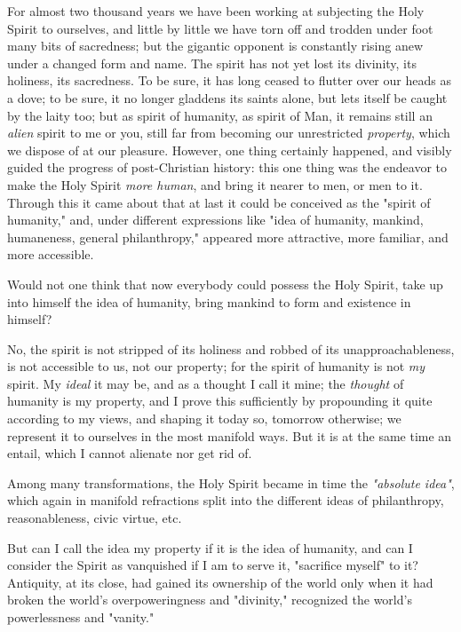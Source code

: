 For almost two thousand years we have been working at subjecting the Holy 
Spirit to ourselves, and little by little we have torn off and trodden under 
foot many bits of sacredness; but the gigantic opponent is constantly rising 
anew under a changed form and name. The spirit has not yet lost its divinity, 
its holiness, its sacredness. To be sure, it has long ceased to flutter over 
our heads as a dove; to be sure, it no longer gladdens its saints alone, but 
lets itself be caught by the laity too; but as spirit of humanity, as spirit 
of Man, it remains still an \textit{alien} spirit to me or you, still far from 
becoming our unrestricted \textit{property}, which we dispose of at our 
pleasure. However, one thing certainly happened, and visibly guided the 
progress of post-Christian history: this one thing was the endeavor to make 
the Holy Spirit \textit{more human}, and bring it nearer to men, or men to it. 
Through this it came about that at last it could be conceived as the "{}spirit 
of humanity,"{} and, under different expressions like "{}idea of humanity, 
mankind, humaneness, general philanthropy,"{} appeared more attractive, more 
familiar, and more accessible.

Would not one think that now everybody could possess the Holy Spirit, take up 
into himself the idea of humanity, bring mankind to form and existence in 
himself?

No, the spirit is not stripped of its holiness and robbed of its 
unapproachableness, is not accessible to us, not our property; for the spirit 
of humanity is not \textit{my} spirit. My \textit{ideal} it may be, and as a 
thought I call it mine; the \textit{thought} of humanity is my property, and I 
prove this sufficiently by propounding it quite according to my views, and 
shaping it today so, tomorrow otherwise; we represent it to ourselves in the 
most manifold ways. But it is at the same time an entail, which I cannot 
alienate nor get rid of.

Among many transformations, the Holy Spirit became in time the 
\textit{"{}absolute idea"{}}, which again in manifold refractions split into 
the different ideas of philanthropy, reasonableness, civic virtue, etc.

But can I call the idea my property if it is the idea of humanity, and can I 
consider the Spirit as vanquished if I am to serve it, "{}sacrifice myself"{} 
to it? Antiquity, at its close, had gained its ownership of the world only 
when it had broken the world's overpoweringness and "{}divinity,"{} recognized 
the world's powerlessness and "{}vanity."{}

